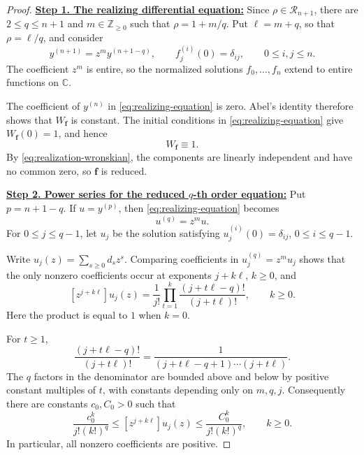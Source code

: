 \documentclass[12pt,letterpaper,reqno]{amsart}
\theoremstyle{definition}
\numberwithin{equation}{section}
\newcommand{\C}{\mathbb C}
\newcommand{\Z}{\mathbb Z}
\newcommand{\Gn}{\mathcal R_{n+1}}
\newcommand{\fv}{\bm f}
\begin{document}
\begin{proof}

\medskip\noindent
\textbf{\underline{Step 1. The realizing differential equation:}}
Since \(\rho\in\Gn\), there are \(2\leq q\leq n+1\) and
\(m\in\Z_{\geq0}\) such that
\(\rho=1+m/q\). Put
\(\ell=m+q\), so that \(\rho=\ell/q\), and consider
\begin{equation}\label{eq:realizing-equation}
 y^{(n+1)}
 =
 z^m y^{({n+1}-q)},
 \qquad
 f_j^{(i)}(0)=\delta_{ij},
 \qquad
 0\leq i,j\leq n.
\end{equation}
The coefficient \(z^m\) is entire, so the normalized solutions
\(f_0,\ldots,f_{n}\) extend to entire functions on \(\C\).

The coefficient of \(y^{(n)}\) in
\eqref{eq:realizing-equation} is zero. Abel's identity therefore shows
that \(W_{\fv}\) is constant. The initial conditions in
\eqref{eq:realizing-equation} give \(W_{\fv}(0)=1\), and hence
\begin{equation}\label{eq:realization-wronskian}
 W_{\fv}\equiv1.
\end{equation}
By \eqref{eq:realization-wronskian}, the components are linearly independent and have no
common zero, so \(\fv\) is reduced.


\medskip\noindent
\textbf{\underline{Step 2. Power series for the reduced \(q\)-th order equation:}}
Put \(p={n+1}-q\). If \(u=y^{(p)}\), then
\eqref{eq:realizing-equation} becomes
\[
u^{(q)}=z^m u.
\]
For \(0\leq j\leq q-1\), let \(u_j\) be the solution satisfying
\(u_j^{(i)}(0)=\delta_{ij}\), \(0\leq i\leq q-1\).

Write \(u_j(z)=\sum_{s\geq0}d_sz^s\). Comparing coefficients in
\(u_j^{(q)}=z^m u_j\) shows that the only nonzero coefficients occur
at exponents \(j+k\ell\), \(k\geq0\), and
\begin{equation}\label{eq:realizing-series}
 [z^{j+k\ell}]u_j(z)
 =
 \frac1{j!}
 \prod_{t=1}^k
 \frac{(j+t\ell-q)!}{(j+t\ell)!},
 \qquad
 k\geq0.
\end{equation}
Here the product is equal to \(1\) when \(k=0\).

For \(t\geq1\),
\[
\frac{(j+t\ell-q)!}{(j+t\ell)!}
=
\frac1{
 (j+t\ell-q+1)\cdots(j+t\ell)
 }.
\]
The \(q\) factors in the denominator are bounded above and below by
positive constant multiples of \(t\), with constants depending only on
\(m,q,j\). Consequently there are constants
\(c_0,C_0>0\) such that
\begin{equation}\label{eq:realizing-coefficient-bounds}
 \frac{c_0^k}{j!(k!)^q}
 \leq
 [z^{j+k\ell}]u_j(z)
 \leq
 \frac{C_0^k}{j!(k!)^q},
 \qquad
 k\geq0.
\end{equation}
In particular, all nonzero coefficients are positive.



\end{proof}
\end{document}

